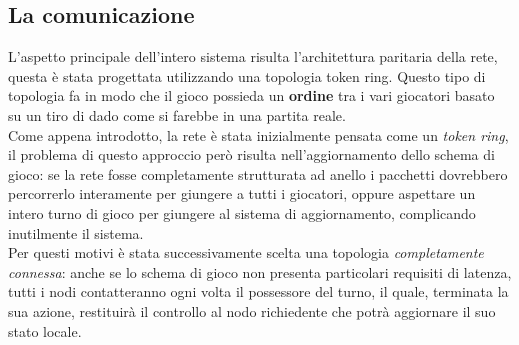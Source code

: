\subsection{La comunicazione}
L'aspetto principale dell'intero sistema risulta l'architettura paritaria
della rete, questa \`e stata progettata utilizzando una topologia token
ring. Questo tipo di topologia fa in modo che il gioco possieda un
\textbf{ordine} tra i vari giocatori basato su un tiro di dado come si farebbe
in una partita reale.\\
Come appena introdotto, la rete \`e stata inizialmente pensata come un \emph{token ring}, il
problema di questo approccio per\`o risulta nell'aggiornamento dello schema di
gioco: se la rete fosse completamente strutturata ad anello i pacchetti dovrebbero
percorrerlo interamente per giungere a tutti i giocatori, oppure aspettare
un intero turno di gioco per giungere al sistema di aggiornamento, complicando
inutilmente il sistema.\\
Per questi motivi \`e stata successivamente scelta una topologia \emph{completamente connessa}: anche se lo
schema di gioco non presenta particolari requisiti di latenza, tutti i nodi
contatteranno ogni volta il possessore del turno, il quale, terminata la sua
azione, restituir\`a il controllo al nodo richiedente che potr\`a aggiornare il suo
stato locale.\\

